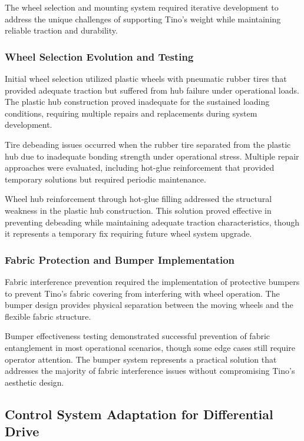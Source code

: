 The wheel selection and mounting system required iterative development to address the unique challenges of supporting Tino's weight while maintaining reliable traction and durability.

\subsubsection{Wheel Selection Evolution and Testing}

Initial wheel selection utilized plastic wheels with pneumatic rubber tires that provided adequate traction but suffered from hub failure under operational loads. The plastic hub construction proved inadequate for the sustained loading conditions, requiring multiple repairs and replacements during system development.

Tire debeading issues occurred when the rubber tire separated from the plastic hub due to inadequate bonding strength under operational stress. Multiple repair approaches were evaluated, including hot-glue reinforcement that provided temporary solutions but required periodic maintenance.

Wheel hub reinforcement through hot-glue filling addressed the structural weakness in the plastic hub construction. This solution proved effective in preventing debeading while maintaining adequate traction characteristics, though it represents a temporary fix requiring future wheel system upgrade.

\subsubsection{Fabric Protection and Bumper Implementation}

Fabric interference prevention required the implementation of protective bumpers to prevent Tino's fabric covering from interfering with wheel operation. The bumper design provides physical separation between the moving wheels and the flexible fabric structure.

Bumper effectiveness testing demonstrated successful prevention of fabric entanglement in most operational scenarios, though some edge cases still require operator attention. The bumper system represents a practical solution that addresses the majority of fabric interference issues without compromising Tino's aesthetic design.

\subsection{Control System Adaptation for Differential Drive}


